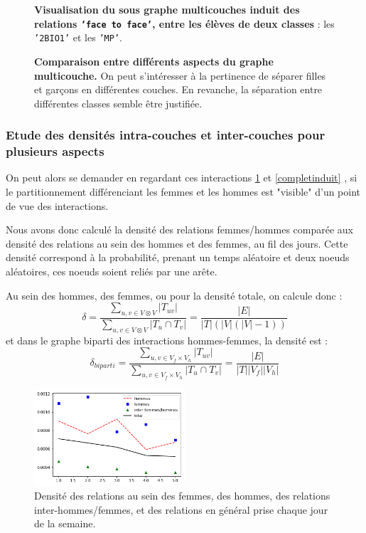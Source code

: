 \documentclass[11pt,a4paper]{article}
\theoremstyle{definition}
\theoremstyle{remark}
\theoremstyle{remark}
\begin{document}
\begin{figure}[H]
\begin{minipage}[t]{0.48\textwidth}
		\captionsetup{margin=10pt}
		\caption{\textbf{Visualisation du sous graphe multicouches induit des relations \texttt{'face to face'}, entre les élèves de deux classes} : les \texttt{'2BIO1'} et les \texttt{'MP'}.}
	\end{minipage}
	\caption{\textbf{Comparaison entre différents aspects du graphe multicouche. } On peut s'intéresser à la pertinence de séparer filles et garçons en différentes couches. En revanche, la séparation entre différentes classes semble être justifiée.}
	\label{induit}
\end{figure}
	
	
\subsubsection{Etude des densités intra-couches et inter-couches pour plusieurs aspects}
	On peut alors se demander en regardant ces interactions \cref{induit} et \cref{completinduit} , si le partitionnement différenciant les femmes et les hommes est "visible" d'un point de vue des interactions.

Nous avons donc calculé la densité des relations femmes/hommes comparée aux densité des relations au sein des hommes et des femmes, au fil des jours. Cette densité correspond à la probabilité, prenant un temps aléatoire et deux noeuds aléatoires, ces noeuds soient reliés par une arête.

Au sein des hommes, des femmes, ou pour la densité totale, on calcule donc :$$
\delta = \frac{\sum_{u,v \in V\otimes V} |T_{uv}|}{\sum_{u,v \in V \otimes V}|T_u\cap T_v|} = \frac{|E|}{|T|(|V|(|V|-1))}$$
et dans le graphe biparti des interactions hommes-femmes, la densité est :
$$\delta_{biparti}=\frac{\sum_{u,v \in V_f \times V_h} |T_{uv}|}{\sum_{u,v \in V_f \times V_h}|T_u\cap T_v|}=\frac{|E|}{|T||V_f||V_h|}$$
\begin{figure}[H]
	\centering
	\includegraphics[width=0.5\textwidth]{compfg.png}
	\caption{Densité des relations au sein des femmes, des hommes, des relations inter-hommes/femmes, et des relations en général prise chaque jour de la semaine.}
	\label{densitesemaine}
\end{figure}
\end{document}

